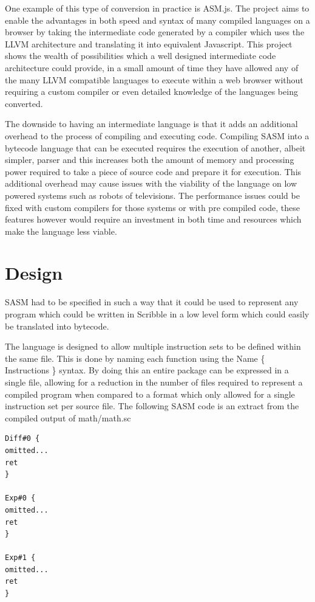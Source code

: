 \documentclass[]{final_report}
\begin{document}
One example of this type of conversion in practice is ASM.js. The project aims to enable the advantages in both speed and syntax of many compiled languages on a browser by taking the intermediate code generated by a compiler which uses the LLVM architecture and translating it into equivalent Javascript\cite{ASMJSSPEC}. This project shows the wealth of possibilities which a well designed intermediate code architecture could provide, in a small amount of time they have allowed any of the many LLVM compatible languages to execute within a web browser without requiring a custom compiler or even detailed knowledge of the languages being converted.

The downside to having an intermediate language is that it adds an additional overhead to the process of compiling and executing code. Compiling SASM into a bytecode language that can be executed requires the execution of another, albeit simpler, parser and this increases both the amount of memory and processing power required to take a piece of source code and prepare it for execution. This additional overhead may cause issues with the viability of the language on low powered systems such as robots of televisions. The performance issues could be fixed with custom compilers for those systems or with pre compiled code, these features however would require an investment in both time and resources which make the language less viable.

\section{Design}

SASM had to be specified in such a way that it could be used to represent any program which could be written in Scribble in a low level form which could easily be translated into bytecode.

The language is designed to allow multiple instruction sets to be defined within the same file. This is done by naming each function using the Name \{ Instructions \} syntax. By doing this an entire package can be expressed in a single file, allowing for a reduction in the number of files required to represent a compiled program when compared to a format which only allowed for a single instruction set per source file. The following SASM code is an extract from the compiled output of math/math.sc

\begin{verbatim}
Diff#0 {
omitted...
ret
}

Exp#0 {
omitted...
ret
}

Exp#1 {
omitted...
ret
}
\end{verbatim}
\end{document}
